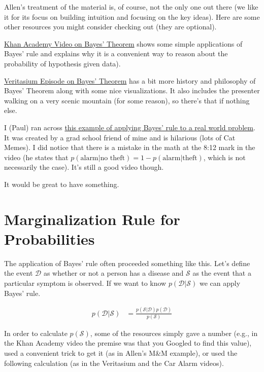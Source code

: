 \documentclass[assignment01_Solutions]{subfiles}
\begin{document}
\begin{externalresources}[(60 minutes)]
Allen's treatment of the material is, of course, not the only one out there (we like it for its focus on building intuition and focusing on the key ideas).  Here are some other resources you might consider checking out (they are optional).
\bi
\item \href{https://www.khanacademy.org/partner-content/wi-phi/wiphi-critical-thinking/wiphi-fundamentals/v/bayes-theorem}{Khan Academy Video on Bayes' Theorem} shows some simple applications of Bayes' rule and explains why it is a convenient way to reason about the probability of hypothesis given data).
\item \href{https://www.youtube.com/watch?v=R13BD8qKeTg}{Veritasium Episode on Bayes' Theorem} has a bit more history and philosophy of Bayes' Theorem along with some nice visualizations.  It also includes the presenter walking on a very scenic mountain (for some reason), so there's that if nothing else.
\item I (Paul) ran across \href{https://youtube.com/watch?v=nvqXXlz-rx0}{this example of applying Bayes' rule to a real world problem}.  It was created by a grad school friend of mine and is hilarious (lots of Cat Memes).  I did notice that there is a mistake in the math at the 8:12 mark in the video (he states that $p(\mbox{alarm} | \mbox{no theft}) = 1 - p(\mbox{alarm} | \mbox{theft})$, which is not necessarily the case).  It's still a good video though.
\ei

\end{externalresources}

\begin{exercise}
It would be great to have something.
\end{exercise}

\section{Marginalization Rule for Probabilities}
The application of Bayes' rule often proceeded something like this.  Let's define the event $\mathcal{D}$ as whether or not a person has a disease and $\mathcal{S}$ as the event that a particular symptom is observed.  If we want to know $p(\mathcal{D} | \mathcal{S})$ we can apply Bayes' rule.

\begin{align}
p(\mathcal{D} | \mathcal{S}) &= \frac{p(\mathcal{S} | \mathcal{D}) p(\mathcal{D})}{p(\mathcal{S})} \label{eq:bayesdenominator}
\end{align}

In order to calculate $p(\mathcal{S})$, some of the resources simply gave a number (e.g., in the Khan Academy video the premise was that you Googled to find this value), used a convenient trick to get it (as in Allen's M\&M example), or used the following calculation (as in the Veritasium and the Car Alarm videos).
\end{document}
